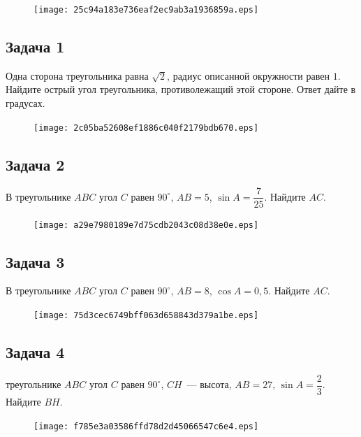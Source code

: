 \documentclass[a4paper,10pt]{article} %
\begin{document}
\begin{spacing}{1.0}
{\large
\begin{figure}{\texttt{[image: 25c94a183e736eaf2ec9ab3a1936859a.eps]}}\end{figure}
\subsection*{Задача 1}
Одна сторона треугольника равна $\sqrt{2}$, радиус описанной окружности равен $1$. Найдите острый угол треугольника, противолежащий этой стороне. Ответ дайте в градусах.

\vspace{1.5cm}

\begin{figure}{\texttt{[image: 2c05ba52608ef1886c040f2179bdb670.eps]}}\end{figure}
\subsection*{Задача 2}
\noindent
В треугольнике $ABC$ угол $C$ равен $90^\circ$, $AB=5$, $\sin A=\dfrac{7}{25}$. Найдите $AC$.

\vspace{1.5cm}

\begin{figure}{\texttt{[image: a29e7980189e7d75cdb2043c08d38e0e.eps]}}\end{figure}
\subsection*{Задача 3}
\noindent
В треугольнике $ABC$ угол $C$ равен $90^\circ$, $AB=8$, $\cos A=0,5$. Найдите $AC$.

\vspace{1.5cm}

\begin{figure}{\texttt{[image: 75d3cec6749bff063d658843d379a1be.eps]}}\end{figure}
\subsection*{Задача 4}
 треугольнике $ABC$ угол $C$ равен $90^\circ$, $CH$~--- высота, $AB=27$, $\sin A=\dfrac{2}{3}$. Найдите $BH$.

\vspace{1.5cm}

\begin{figure}{\texttt{[image: f785e3a03586ffd78d2d45066547c6e4.eps]}}\end{figure}
}
\end{spacing}
\end{document}
